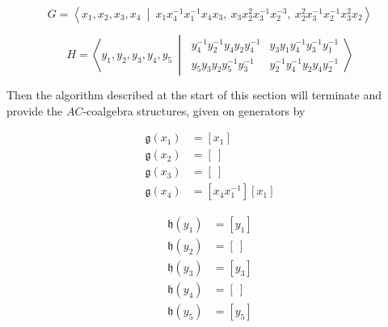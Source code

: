 \documentclass[microtype]{gtpart}
\theoremstyle{definition}
\theoremstyle{theorem}
\begin{document}
\[
  G =
  \left \langle 
  x_1, x_2, x_3, x_4
  \ \middle | \ 
  x_1 x_4^{-1} x_1^{-1} x_4 x_3, \ 
  x_3 x_2^2 x_3^{-1} x_2^{-3}, \ 
  x_2^2 x_3^{-1} x_2^{-1} x_3^2 x_2
  \right \rangle
\]

\[
  H = 
  \left \langle 
  y_1,y_2,y_3,y_4,y_5
  \ \middle | \ 
  \begin{array}{cc}
    y_4^{-1} y_2^{-1} y_4 y_2 y_4^{-1} & y_3 y_1 y_4^{-1} y_3^{-1} y_1^{-1} \\
    y_5 y_3 y_2 y_5^{-1} y_3^{-1} & y_2^{-1} y_4^{-1} y_2 y_4 y_2^{-1}
  \end{array}
  \right \rangle
\]

%
%
% 
%
%
%
%
%
%

Then the algorithm described at the start of this section will terminate and 
provide the $AC$-coalgebra structures, given on generators by

\noindent\begin{minipage}{.5\linewidth}
\begin{align*}
  \mathfrak{g}(x_1) &= [x_1] \\
  \mathfrak{g}(x_2) &= [\ ]  \\
  \mathfrak{g}(x_3) &= [\ ]  \\
  \mathfrak{g}(x_4) &= [x_4 x_1^{-1}][x_1]
\end{align*}
\end{minipage}%
\begin{minipage}{.5\linewidth}  
\begin{align*}
  \mathfrak{h}(y_1) &= [y_1] \\
  \mathfrak{h}(y_2) &= [\ ]  \\
  \mathfrak{h}(y_3) &= [y_3] \\
  \mathfrak{h}(y_4) &= [\ ]  \\
  \mathfrak{h}(y_5) &= [y_5]
\end{align*}
\end{minipage}
\end{document}
